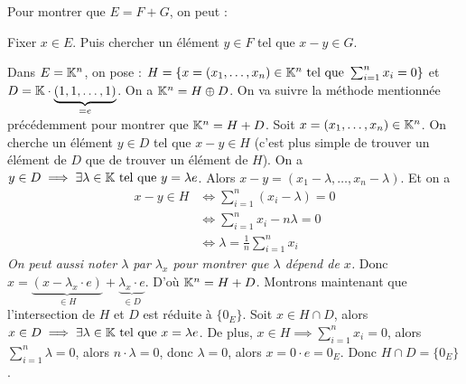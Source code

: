 \documentclass[12pt, a4paper]{report}
\begin{document}
\begin{methodbox}
    Pour montrer que $E = F + G$, on peut :

    \begin{outline}
    \1 Fixer $x \in E$.
    \1 Puis chercher un élément $y \in F$ tel que $x-y \in G$.
    \end{outline}
\end{methodbox}

\begin{example}
    \begin{outline}
        \1 Dans $E = \mathbb{K}^n$, on pose : $H = \{x = (x_1,\dots,x_n) \in \mathbb{K}^n \text{ tel que } \sum_{i=1}^n x_i = 0\}$ et $D = \mathbb{K} \cdot \underbrace{(1,1,\dots,1)}_{=e}$. On a $\mathbb{K}^n = H \oplus D$.
            \2 On va suivre la méthode mentionnée précédemment pour montrer que $\mathbb{K}^n = H + D$.
                \3 Soit $x = (x_1,\dots,x_n) \in \mathbb{K}^n$.
                \3 On cherche un élément $y \in D$ tel que $x-y \in H$ (c'est plus simple de trouver un élément de $D$ que de trouver un élément de $H$).
                \3 On a $y \in D \implies \exists \lambda \in \mathbb{K} \text{ tel que } y = \lambda e$.
                \3 Alors $x-y = (x_1 - \lambda, \dots, x_n - \lambda)$.
                \3 Et on a
                \begin{align*}
                    x-y \in H &\iff \sum_{i=1}^n (x_i - \lambda) = 0 \\
                    &\iff \sum_{i=1}^n x_i - n\lambda = 0 \\
                    &\iff \lambda = \frac{1}{n} \sum_{i=1}^n x_i
                \end{align*}
                \3 \textit{On peut aussi noter $\lambda$ par $\lambda_x$ pour montrer que $\lambda$ dépend de $x$.}
                \3 Donc $x = \underbrace{(x- \lambda_x\cdot e)}_{\in H} + \underbrace{\lambda_x \cdot e}_{\in D}$.
                \3 D'où $\mathbb{K}^n = H + D$.
            \2 Montrons maintenant que l'intersection de $H$ et $D$ est réduite à $\{0_E\}$.
                \3 Soit $x \in H\cap D$, alors $x \in D \implies \exists \lambda \in \mathbb{K} \text{ tel que } x = \lambda e$.
                \3 De plus, $x \in H \implies \sum_{i=1}^n x_i = 0$, alors $\sum_{i=1}^n \lambda = 0$, alors $n\cdot\lambda = 0$, donc $\lambda = 0$, alors $x = 0\cdot e = 0_E$.
                \3 Donc $H\cap D = \{0_E\}$.
    \end{outline}
    \label{exa:K^n_somme_directe_H_D}
\end{example}
\end{document}

